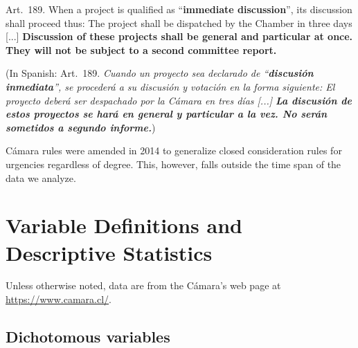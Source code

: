 \documentclass[letter,12pt]{article}
\begin{document}
\bigskip

Art.~189. When a project is qualified as ``\textbf{immediate discussion}'', its discussion shall proceed thus: The project shall be dispatched by the Chamber in three days [...]
\textbf{Discussion of these projects shall be general and particular at once. They will not be subject to a second committee report.}

(In Spanish: Art.~189. \emph{Cuando un proyecto sea declarado de ``\textbf{discusión inmediata}'', se procederá a su discusión y votación en la forma siguiente:
El proyecto deberá ser despachado por la Cámara en tres días [...]
\textbf{La discusión de estos proyectos se hará en general y particular a la vez. No serán sometidos a segundo informe.}})

\doublespacing

Cámara rules were amended in 2014 to generalize closed consideration rules for urgencies regardless of degree. This, however, falls outside the time span of the data we analyze.


\section{Variable Definitions and Descriptive Statistics}

Unless otherwise noted, data are from the Cámara's web page at \url{https://www.camara.cl/}.

\subsection{Dichotomous variables}\label{s:descriptives-dummies}
\end{document}
